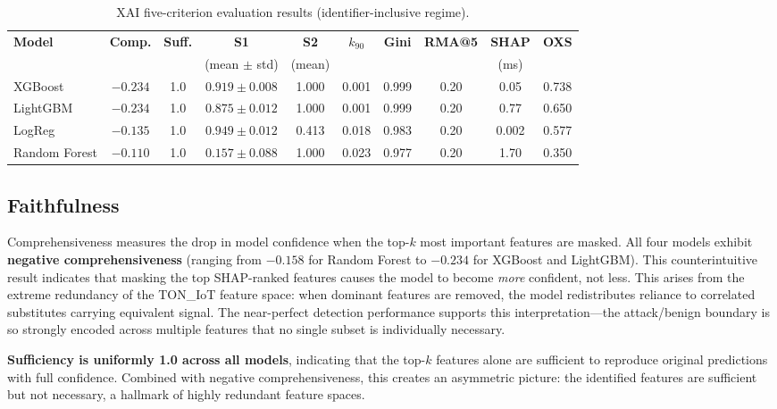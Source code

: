 \documentclass[12pt,a4paper]{report}
\begin{document}
\begin{table}[H]
\centering
\caption{XAI five-criterion evaluation results (identifier-inclusive regime).}
\label{tab:xai-ident}
\small
\begin{tabular}{lccccccccc}
\toprule
\textbf{Model} & \textbf{Comp.} & \textbf{Suff.} & \textbf{S1} & \textbf{S2} & \textbf{$k_{90}$} & \textbf{Gini} & \textbf{RMA@5} & \textbf{SHAP} & \textbf{OXS} \\
 & & & (mean $\pm$ std) & (mean) & & & & (ms) & \\
\midrule
XGBoost & $-0.234$ & 1.0 & $0.919 \pm 0.008$ & 1.000 & 0.001 & 0.999 & 0.20 & 0.05 & 0.738 \\
LightGBM & $-0.234$ & 1.0 & $0.875 \pm 0.012$ & 1.000 & 0.001 & 0.999 & 0.20 & 0.77 & 0.650 \\
LogReg & $-0.135$ & 1.0 & $0.949 \pm 0.012$ & 0.413 & 0.018 & 0.983 & 0.20 & 0.002 & 0.577 \\
Random Forest & $-0.110$ & 1.0 & $0.157 \pm 0.088$ & 1.000 & 0.023 & 0.977 & 0.20 & 1.70 & 0.350 \\
\bottomrule
\end{tabular}
\end{table}

\subsection{Faithfulness}
\label{sec:faith-results}

Comprehensiveness measures the drop in model confidence when the top-$k$ most important features are masked. All four models exhibit \textbf{negative comprehensiveness} (ranging from $-0.158$ for Random Forest to $-0.234$ for XGBoost and LightGBM). This counterintuitive result indicates that masking the top SHAP-ranked features causes the model to become \emph{more} confident, not less. This arises from the extreme redundancy of the TON\_IoT feature space: when dominant features are removed, the model redistributes reliance to correlated substitutes carrying equivalent signal. The near-perfect detection performance supports this interpretation---the attack/benign boundary is so strongly encoded across multiple features that no single subset is individually necessary.

\textbf{Sufficiency is uniformly 1.0 across all models}, indicating that the top-$k$ features alone are sufficient to reproduce original predictions with full confidence. Combined with negative comprehensiveness, this creates an asymmetric picture: the identified features are sufficient but not necessary, a hallmark of highly redundant feature spaces.
\end{document}
